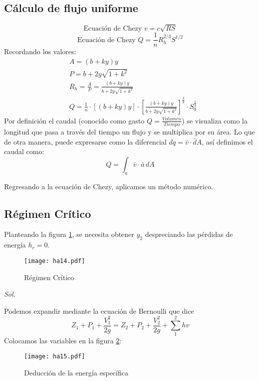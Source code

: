 \subsection{Cálculo de flujo uniforme}
\begin{equation}
    \text{Ecuación de Chezy } v= c \sqrt{RS}
\end{equation}
\begin{equation}
    \text{Ecuación de Chezy }Q= \frac{1}{n}R_h^{2/3}S^{1/2}
\end{equation}
Recordando los valores:
\begin{align}
    &A =\left(b + ky\right)y\\
    &P = b + 2y \sqrt{1 +k^2}\\
    &R_h = \frac{A}{P}=\frac{\left(b + ky\right)y}{b + 2y \sqrt{1 +k^2}}\\
    &Q = \frac{1}{n}\cdot \left[\left(b + ky\right)y\right]\cdot \left[\frac{\left(b + ky\right)y}{b + 2y \sqrt{1 +k^2}}\right]^{\frac{2}{3}}\cdot S_0^{\frac{1}{2}}
\end{align}
Por definición el caudal (conocido como gasto $Q=\frac{Volumen}{Tiempo}$) se visualiza como la longitud que pasa a través del tiempo un flujo y se multiplica por su área.
Lo que de otra manera, puede expresarse como la diferencial $dq=\bar{v}\cdot\bar{d}A$, así definimos el caudal como:
\begin{equation}
    Q = \int_a\bar{v}\cdot \bar{a}\,d{A}
\end{equation}

Regresando a la ecuación de Chezy, aplicamos un método numérico.
\subsection{Régimen Crítico}
Planteando la figura \ref{ha14}, se necesita obtener $y_2$ despreciando las pérdidas de energía $h_r=0$.
\begin{figure}[h!]
\centering
  \texttt{[image: ha14.pdf]}
  \caption{Régimen Crítico}
  \label{ha14}
\end{figure}

\textit{ Sol. }

Podemos expandir mediante la ecuación de Bernoulli que dice
\begin{equation}
    Z_1 +P_1 + \frac{V_1^2}{2g} = Z_2 + P_2 + \frac{V_2^2}{2g} + \sum_1^2hv
\end{equation}
Colocamos las variables en la figura \ref{ha15}:
\begin{figure}[h!]
\centering
  \texttt{[image: ha15.pdf]}
  \caption{Deducción de la energía específica}
  \label{ha15}
\end{figure}

